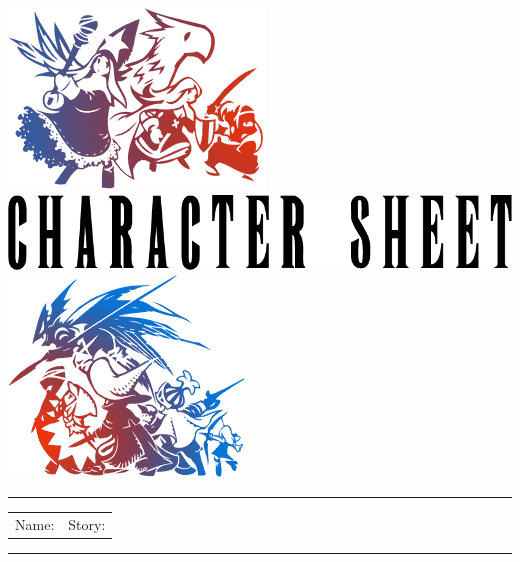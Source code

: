 \thispagestyle{empty}
\Large
\onecolumn
{
	\noindent \includegraphics[width=0.18\columnwidth]{./art/images/tleft.png} 
	\hspace{0.8cm}
	\includegraphics[width=0.55\columnwidth]{./art/images/cs.png}
	\hfill
	\includegraphics[width=0.15\columnwidth]{./art/images/tright.png} \\
}
\vspace{-0.5cm}
\hrule
\begin{tabularx}{\columnwidth}{XX@{\hspace{0.3cm}}}
		\noindent \newline
		\hypertarget{cs}{Name:}
		\newline 
		\newline
		\newline
		\newline
		\newline
		\newline
		\newline \newline \newline
		\newline  
		&  
		\noindent \newline
		Story:
		\newline  \newline 
		\newline \newline \newline \newline \newline
		 \newline
	\end{tabularx}
\hrule 
